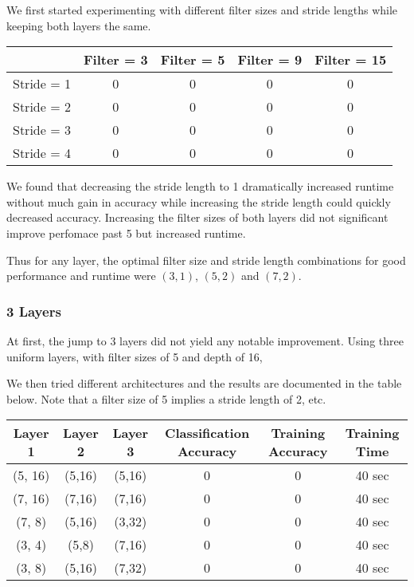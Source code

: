 \documentclass[10pt,twoside]{article}
\begin{document}
 We first started experimenting with different filter sizes and stride lengths while keeping both layers the same.

\begin{center}
 \begin{tabular}{||c c c c c||} 
 \hline
  & Filter = 3 & Filter = 5 & Filter = 9 & Filter = 15 \\ [0.5ex] 
 \hline\hline
 Stride = 1 & 0 & 0 & 0 & 0 \\ 
 \hline
 Stride = 2 & 0 & 0 & 0 & 0 \\
 \hline
 Stride = 3 & 0 & 0 & 0 & 0 \\
 \hline
 Stride = 4 & 0 & 0 & 0 & 0 \\
 \hline
\end{tabular}
\end{center}

 We found that decreasing the stride length to 1 dramatically increased runtime without much gain in accuracy while increasing the stride length could quickly decreased accuracy. Increasing the filter sizes of both layers did not significant improve perfomace past 5 but increased runtime.

Thus for any layer, the optimal filter size and stride length combinations for good performance and runtime were $(3,1)$, $(5,2)$ and $(7,2)$.

\subsubsection{3 Layers}
At first, the jump to 3 layers did not yield any notable improvement. Using three uniform layers, with filter sizes of 5 and depth of 16, 

We then tried different architectures and the results are documented in the table below. Note that a filter size of 5 implies a stride length of 2, etc.

\begin{center}
 \begin{tabular}{||c c c c c c||} 
 \hline
 Layer 1 & Layer 2 & Layer 3 & Classification Accuracy & Training Accuracy & Training Time \\ [0.5ex] 
 \hline\hline
 (5, 16) & (5,16) & (5,16) & 0 & 0 & 40 sec \\ 
 \hline
 (7, 16) & (7,16) & (7,16) & 0 & 0 & 40 sec \\ 
 \hline
 (7, 8)  & (5,16) & (3,32) & 0 & 0 & 40 sec \\ 
 \hline
 (3, 4)  & (5,8) & (7,16) & 0 & 0 & 40 sec \\ 
 \hline
 (3, 8)  & (5,16) & (7,32) & 0 & 0 & 40 sec \\ 
 \hline
\end{tabular}
\end{center}
\end{document}
